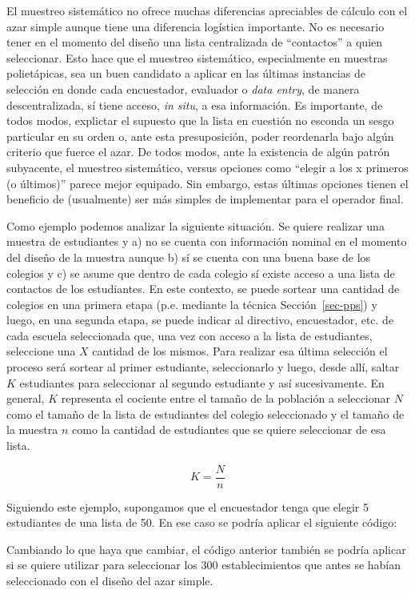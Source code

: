\documentclass[
  spanish,
  a4paper,
]{scrreprt}
\begin{document}
El muestreo sistemático no ofrece muchas diferencias apreciables de
cálculo con el azar simple aunque tiene una diferencia logística
importante. No es necesario tener en el momento del diseño una lista
centralizada de ``contactos'' a quien seleccionar. Esto hace que el
muestreo sistemático, especialmente en muestras polietápicas, sea un
buen candidato a aplicar en las últimas instancias de selección en donde
cada encuestador, evaluador o \emph{data entry}, de manera
descentralizada, sí tiene acceso, \emph{in situ}, a esa información. Es
importante, de todos modos, explictar el supuesto que la lista en
cuestión no esconda un sesgo particular en su orden o, ante esta
presuposición, poder reordenarla bajo algún criterio que fuerce el azar.
De todos modos, ante la existencia de algún patrón subyacente, el
muestreo sistemático, versus opciones como ``elegir a los x primeros (o
últimos)'' parece mejor equipado. Sin embargo, estas últimas opciones
tienen el beneficio de (usualmente) ser más simples de implementar para
el operador final.

Como ejemplo podemos analizar la siguiente situación. Se quiere realizar
una muestra de estudiantes y a) no se cuenta con información nominal en
el momento del diseño de la muestra aunque b) sí se cuenta con una buena
base de los colegios y c) se asume que dentro de cada colegio sí existe
acceso a una lista de contactos de los estudiantes. En este contexto, se
puede sortear una cantidad de colegios en una primera etapa (p.e.
mediante la técnica Sección~\ref{sec-pps}) y luego, en una segunda
etapa, se puede indicar al directivo, encuestador, etc. de cada escuela
seleccionada que, una vez con acceso a la lista de estudiantes,
seleccione una \(X\) cantidad de los mismos. Para realizar esa última
selección el proceso será sortear al primer estudiante, seleccionarlo y
luego, desde allí, saltar \(K\) estudiantes para seleccionar al segundo
estudiante y así sucesivamente. En general, \(K\) representa el cociente
entre el tamaño de la población a seleccionar \(N\) como el tamaño de la
lista de estudiantes del colegio seleccionado y el tamaño de la muestra
\(n\) como la cantidad de estudiantes que se quiere seleccionar de esa
lista.

\[K = \frac{N}{n}\]

Siguiendo este ejemplo, supongamos que el encuestador tenga que elegir 5
estudiantes de una lista de 50. En ese caso se podría aplicar el
siguiente código:

Cambiando lo que haya que cambiar, el código anterior también se podría
aplicar si se quiere utilizar para seleccionar los 300 establecimientos
que antes se habían seleccionado con el diseño del azar simple.
\end{document}
